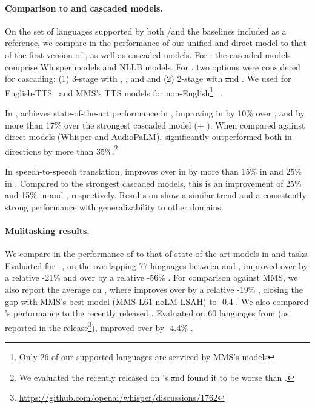 \paragraph{Comparison to \mfourt and cascaded models.}
On the set of languages supported by both \mfourt/\mfourttwo and the baselines included as a reference, we compare in  the performance of our unified and direct model to that of the first version of \mfourt, as well as cascaded models.
For \st, the cascaded models comprise Whisper \asr models and NLLB \mt models.
For \sst, two options were considered for cascading: (1) 3-stage with \asr, \mt, and \tts and (2) 2-stage with \st and \tts.
We used \yourtts for English-TTS~\citep{casanova2022yourtts} and MMS's TTS models for non-English\footnote{Only 26 of our \ntslangs supported languages are serviced by MMS's \tts models} \tts~\citep{mms}.



In \fleurs, \mfourttwo achieves state-of-the-art performance in \st, improving in \xeng by 10\% over \mfourtlg, and by more than 17\% over the strongest cascaded model (\whisperlarge + \nllbmedium). When compared against direct models (\eg Whisper and AudioPaLM), \mfourttwo significantly outperformed both in \xeng directions by more than 35\%.\footnote{We evaluated the recently released \whisperlargenew on \fleurs's \st and found it to be worse than \whisperlarge.}

In speech-to-speech translation, \mfourttwo improves over \mfourtlg in \fleurs by more than 15\% in \xeng and 25\% in \engx. Compared to the strongest cascaded models, this is an improvement of 25\% and 15\% in \xeng and \engx, respectively. Results on \cvss show a similar trend and a consistently strong performance with generalizability to other domains.



\paragraph{Mulitasking results.}
We compare in  the performance of \mfourttwo to that of state-of-the-art models in \mt and \asr tasks. 
Evaluated for \fleurs~\asr, on the overlapping 77 languages between \whisperlarge and \mfourt, 
\mfourtlgtwo improved over \mfourtlg by a relative -21\% \wer 
and over \whisperlarge by a relative -56\% \wer.
For comparison against MMS, we also report the average on , where \mfourtlgtwo improves over \mfourtlg by a relative -19\% \wer, closing the gap with MMS's best model (MMS-L61-noLM-LSAH) to -0.4 \wer.
We also compared \mfourtlgtwo's \asr performance to the recently released \whisperlargenew. Evaluated on 60 languages from \fleurs (as reported in the release\footnote{\url{https://github.com/openai/whisper/discussions/1762}}), \mfourtlgtwo improved over \whisperlargenew by -4.4\% \wer. 

